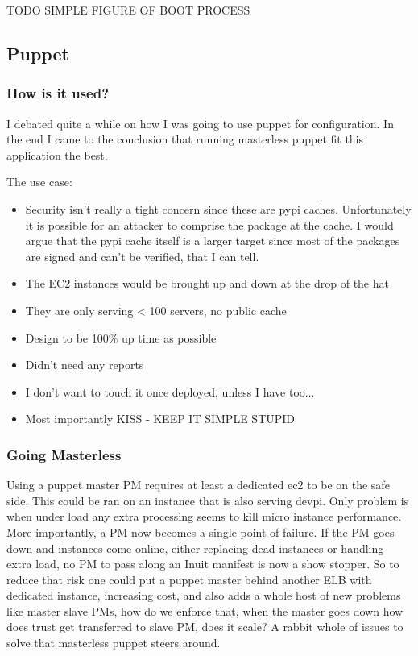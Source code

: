 \documentclass{article}
\begin{document}
TODO SIMPLE FIGURE OF BOOT PROCESS

\subsection{Puppet}
\subsubsection{How is it used?}
I debated quite a while on how I was going to use puppet for configuration. In the end I came to the conclusion that
running masterless puppet fit this application the best.  

The use case:
\begin{itemize}
    \item Security isn't really a tight concern since these are pypi caches. Unfortunately it is possible for an attacker
        to comprise the package at the cache. I would argue that the pypi cache itself is a larger target since most of
        the packages are signed and can't be verified, that I can tell.
    \item The EC2 instances would be brought up and down at the drop of the hat
    \item They are only serving < 100 servers, no public cache
    \item Design to be 100\% up time as possible 
    \item Didn't need any reports
    \item I don't want to touch it once deployed, unless I have too... 
    \item Most importantly KISS - KEEP IT SIMPLE STUPID
\end{itemize}

\subsubsection{Going Masterless}

Using a puppet master PM requires at least a dedicated ec2 to be on the safe side. This could be ran on an instance
that is also serving devpi. Only problem is when under load any extra processing seems to kill micro instance performance.
More importantly, a PM now becomes a single point of failure. If the PM goes down and instances
come online, either replacing dead instances or handling extra load, no PM to pass along an Inuit manifest is now a show stopper.
So to reduce that risk one could put a puppet master behind another ELB with dedicated instance, increasing cost, and also adds 
a whole host of new problems like master slave PMs, how do we enforce that, when the master goes down how does trust get 
transferred to slave PM, does it scale? A rabbit whole of issues to solve that masterless puppet steers around.
\end{document}
